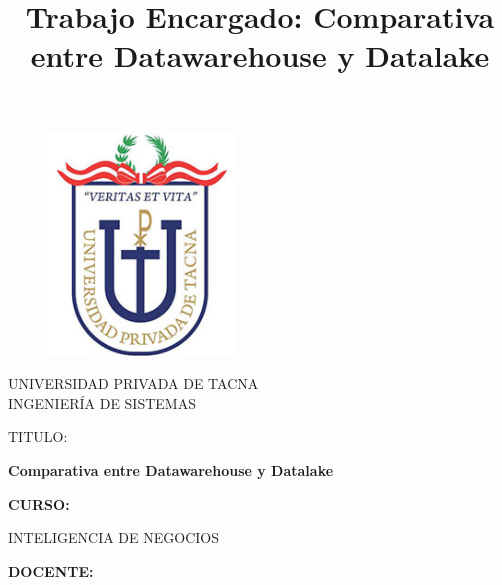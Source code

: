 \documentclass{article}
\begin{document}
\title{Trabajo Encargado: Comparativa entre Datawarehouse y Datalake}
\begin{titlepage}
\begin{figure}[htb]
\begin{center}
\includegraphics[width=5cm]{logo.png}
\end{center}
\end{figure}
\vspace*{-0.25in}
\begin{center}
\large{UNIVERSIDAD PRIVADA DE TACNA}\\
\vspace*{-0.025in}
INGENIERÍA DE SISTEMAS  \\

\vspace*{0.5in}
\begin{large}
TITULO:\\
\end{large}

\vspace*{0.1in}
\begin{Large}
\textbf{Comparativa entre Datawarehouse y Datalake} \\
\end{Large}

\vspace*{0.3in} 
\begin{Large}
\textbf{CURSO:} \\
\end{Large}

\vspace*{0.1in}
\begin{large}
INTELIGENCIA DE NEGOCIOS\\
\end{large}

\vspace*{0.3in}
\begin{Large}
\textbf{DOCENTE:} \\
\end{Large}


\end{center}
\end{titlepage}
\end{document}
